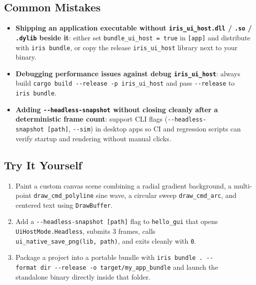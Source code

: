 \documentclass[
  english,
  oneside]{book}
\providecommand{\tightlist}{%
  \setlength{\itemsep}{0pt}\setlength{\parskip}{0pt}}
\begin{document}
\subsection{Common Mistakes}\label{common-mistakes-16}

\begin{itemize}
\tightlist
\item
  \textbf{Shipping an application executable without
  \texttt{iris\_ui\_host.dll} / \texttt{.so} / \texttt{.dylib} beside
  it}: either set \texttt{bundle\_ui\_host\ =\ true} in
  \texttt{{[}app{]}} and distribute with \texttt{iris\ bundle}, or copy
  the release \texttt{iris\_ui\_host} library next to your binary.
\item
  \textbf{Debugging performance issues against debug
  \texttt{iris\_ui\_host}}: always build
  \texttt{cargo\ build\ -\/-release\ -p\ iris\_ui\_host} and pass
  \texttt{-\/-release} to \texttt{iris\ bundle}.
\item
  \textbf{Adding \texttt{-\/-headless-snapshot} without closing cleanly
  after a deterministic frame count}: support CLI flags
  (\texttt{-\/-headless-snapshot\ {[}path{]}}, \texttt{-\/-sim}) in
  desktop apps so CI and regression scripts can verify startup and
  rendering without manual clicks.
\end{itemize}

\subsection{Try It Yourself}\label{try-it-yourself-16}

\begin{enumerate}
\def\labelenumi{\arabic{enumi}.}
\tightlist
\item
  Paint a custom canvas scene combining a radial gradient background, a
  multi-point \texttt{draw\_cmd\_polyline} sine wave, a circular sweep
  \texttt{draw\_cmd\_arc}, and centered text using \texttt{DrawBuffer}.
\item
  Add a \texttt{-\/-headless-snapshot\ {[}path{]}} flag to
  \texttt{hello\_gui} that opens \texttt{UiHostMode.Headless}, submits 3
  frames, calls \texttt{ui\_native\_save\_png(lib,\ path)}, and exits
  cleanly with \texttt{0}.
\item
  Package a project into a portable bundle with
  \texttt{iris\ bundle\ .\ -\/-format\ dir\ -\/-release\ -o\ target/my\_app\_bundle}
  and launch the standalone binary directly inside that folder.
\end{enumerate}
\end{document}

